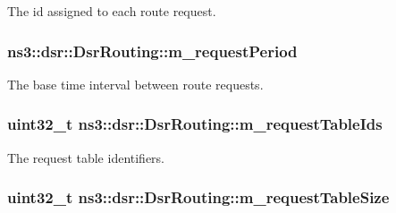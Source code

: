 The id assigned to each route request. 

\subsubsection[{\texorpdfstring{m\+\_\+request\+Period}{m_requestPeriod}}]{ ns3\+::dsr\+::\+Dsr\+Routing\+::m\+\_\+request\+Period\hspace{0.3cm}{\ttfamily [private]}}\hypertarget{classns3_1_1dsr_1_1DsrRouting_acb19e2fe8a4cc1812181cdd5491383ee}{}\label{classns3_1_1dsr_1_1DsrRouting_acb19e2fe8a4cc1812181cdd5491383ee}


The base time interval between route requests. 

\subsubsection[{\texorpdfstring{m\+\_\+request\+Table\+Ids}{m_requestTableIds}}]{\setlength{\rightskip}{0pt plus 5cm}uint32\+\_\+t ns3\+::dsr\+::\+Dsr\+Routing\+::m\+\_\+request\+Table\+Ids\hspace{0.3cm}{\ttfamily [private]}}\hypertarget{classns3_1_1dsr_1_1DsrRouting_aac8b18967bf0bc05a7f0024ea55e99b1}{}\label{classns3_1_1dsr_1_1DsrRouting_aac8b18967bf0bc05a7f0024ea55e99b1}


The request table identifiers. 

\subsubsection[{\texorpdfstring{m\+\_\+request\+Table\+Size}{m_requestTableSize}}]{\setlength{\rightskip}{0pt plus 5cm}uint32\+\_\+t ns3\+::dsr\+::\+Dsr\+Routing\+::m\+\_\+request\+Table\+Size\hspace{0.3cm}{\ttfamily [private]}}\hypertarget{classns3_1_1dsr_1_1DsrRouting_a8f6df12e2c9690f79943c2195af1be37}{}\label{classns3_1_1dsr_1_1DsrRouting_a8f6df12e2c9690f79943c2195af1be37}



